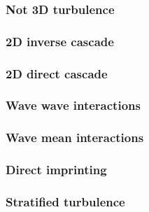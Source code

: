 \subsubsection{Not 3D turbulence}

\subsubsection{2D inverse cascade}

\subsubsection{2D direct cascade}

\subsubsection{Wave wave interactions}

\subsubsection{Wave mean interactions}

\subsubsection{Direct imprinting}

\subsubsection{Stratified turbulence}

